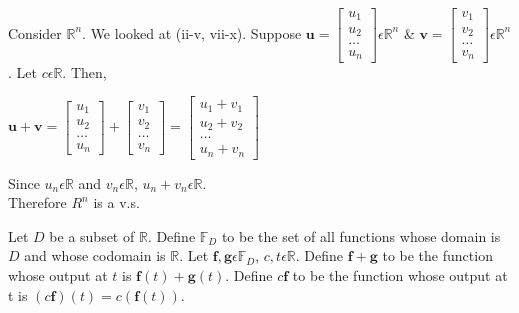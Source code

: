 \documentclass{report}
\begin{document}
Consider $\mathbb{R}^n$. We looked at (ii-v, vii-x). Suppose $\mathbf{u}=\begin{bmatrix} u_1 \\ u_2 \\ \ldots \\ u_n \end{bmatrix}\epsilon \mathbb{R}^n$ \& $\mathbf{v}=\begin{bmatrix} v_1 \\ v_2 \\ \ldots \\ v_n \end{bmatrix}\epsilon \mathbb{R}^n$. Let $c\epsilon \mathbb{R}$. Then,
\begin{center}
	$\mathbf{u}+\mathbf{v}=\begin{bmatrix} u_1 \\ u_2 \\ \ldots \\ u_n \end{bmatrix}+\begin{bmatrix} v_1 \\ v_2 \\ \ldots \\ v_n \end{bmatrix}=\begin{bmatrix} u_1+v_1 \\ u_2+v_2 \\ \ldots \\ u_n+v_n \end{bmatrix}$
\end{center}
Since $u_n\epsilon \mathbb{R}$ and $v_n\epsilon \mathbb{R}$, $u_n+v_n\epsilon \mathbb{R}$.\\
Therefore $R^n$ is a v.s.
\begin{definition}

\end{definition}
\begin{definition}
	Let $D$ be a subset of $\mathbb{R}$. Define $\mathbb{F}_D$ to be the set of all functions whose domain is $D$ and whose codomain is $\mathbb{R}$. Let $\mathbf{f},\mathbf{g}\epsilon \mathbb{F}_D$, $c,t \epsilon \mathbb{R}$. Define $\mathbf{f}+\mathbf{g}$ to be the function whose output at $t$ is $\mathbf{f}(t)+\mathbf{g}(t)$. Define $c\mathbf{f}$ to be the function whose output at t is $(c\mathbf{f})(t)=c(\mathbf{f}(t))$.
\end{definition}
\end{document}
